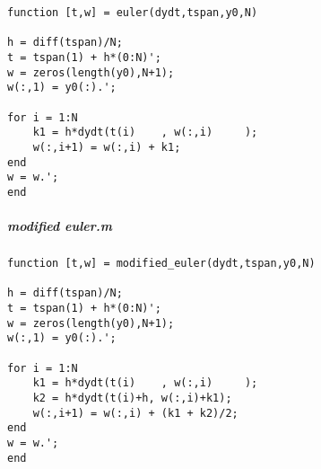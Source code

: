     \begin{verbatim}
function [t,w] = euler(dydt,tspan,y0,N)

h = diff(tspan)/N;
t = tspan(1) + h*(0:N)';
w = zeros(length(y0),N+1);
w(:,1) = y0(:).';

for i = 1:N
    k1 = h*dydt(t(i)    , w(:,i)     );
    w(:,i+1) = w(:,i) + k1;
end
w = w.';
end
\end{verbatim}

\subparagraph*{modified euler.m}

    \begin{verbatim}
function [t,w] = modified_euler(dydt,tspan,y0,N)

h = diff(tspan)/N;
t = tspan(1) + h*(0:N)';
w = zeros(length(y0),N+1);
w(:,1) = y0(:).';

for i = 1:N
    k1 = h*dydt(t(i)    , w(:,i)     );
    k2 = h*dydt(t(i)+h, w(:,i)+k1);
    w(:,i+1) = w(:,i) + (k1 + k2)/2;
end
w = w.';
end
\end{verbatim}